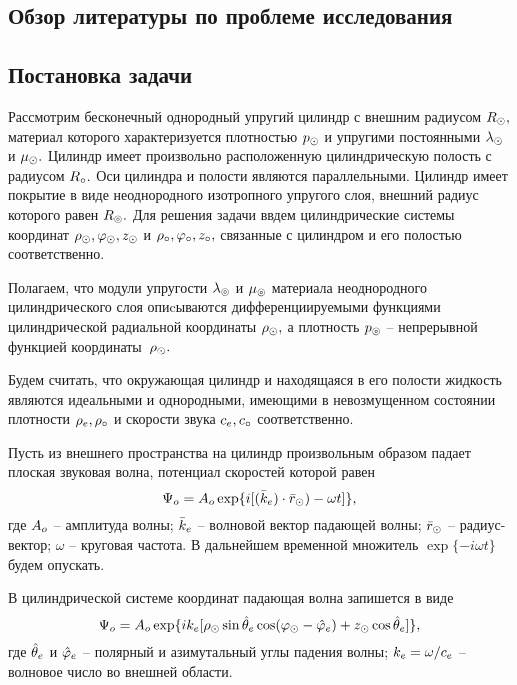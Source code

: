 \newpage
\subsection{Обзор литературы по проблеме исследования}

\newpage
\subsection{Постановка задачи} 

Рассмотрим бесконечный однородный упругий цилиндр с внешним радиусом $R_\odot,$ материал которого характеризуется плотностью $p_\odot$ и упругими постоянными $\lambda_\odot$ и $\mu_\odot.$ Цилиндр имеет произвольно расположенную цилиндрическую полость с радиусом $R_\circ.$ Оси цилиндра и полости являются параллельными. Цилиндр имеет покрытие в виде неоднородного изотропного упругого слоя, внешний радиус которого равен $R_\circledcirc.$ Для решения задачи ввдем цилиндрические системы координат $\rho_\odot, \varphi_\odot, z_\odot$ и $\rho_\circ, \varphi_\circ, z_\circ,$ связанные с цилиндром и его полостью соответственно.

Полагаем, что модули упругости $\lambda_\circledcirc$ и $\mu_\circledcirc$ материала неоднородного цилиндрического слоя опиcываются дифференциируемыми функциями цилиндрической радиальной координаты $\rho_\odot,$ а плотность $p_\circledcirc$ -- непрерывной функцией координаты~$\rho_\odot.$ 

Будем считать, что окружающая цилиндр и находящаяся в его полости жидкость являются идеальными и однородными, имеющими в невозмущенном состоянии плотности $\rho_e, \rho_\circ$ и скорости звука $c_e, c_\circ$ соответственно.

Пусть из внешнего пространства на цилиндр произвольным образом падает плоская звуковая волна, потенциал скоростей которой равен
$$\Psi_o=A_o \exp\{i[(\bar{k}_e)\cdot \bar{r}_\odot)-\omega t]\},$$
где $A_o$ -- амплитуда волны; $\bar{k}_e$ -- волновой вектор падающей волны; $\bar{r}_\odot$ -- радиус-вектор; $\omega$ -- круговая частота. В дальнейшем временной множитель $\exp\{-i\omega t\}$ будем опускать.

В цилиндрической системе координат падающая волна запишется в виде
$$\Psi_o=A_o\exp\{ik_e[\rho_\odot\sin{\hat{\theta}_e}\cos(\varphi_\odot-\hat{\varphi}_e)+z_\odot\cos\hat{\theta}_e]\},$$
где $\hat{\theta}_e$ и $\hat{\varphi}_e$ -- полярный и азимутальный углы падения волны; $k_e=\omega / c_e$ -- волновое число во внешней области.

